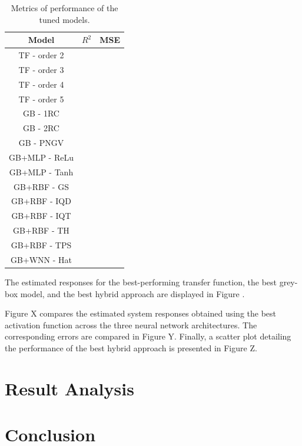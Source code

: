\documentclass[lettersize,journal]{IEEEtran}
\begin{document}
\begin{table}\label{tab:metrics}
	\centering
	\caption{Metrics of performance of the tuned models.}
	\begin{tabular}{c|c|c}
		
		Model& $R^2$ & MSE  \\
		\hline
		TF - order 2 &  &  \\
		TF - order 3 &  &  \\
		TF - order 4 &  &  \\
		TF - order 5 &  &  \\
		\hline
		GB - 1RC &  &  \\
		GB - 2RC &  &  \\
		GB - PNGV &  &  \\
		\hline
		GB+MLP - ReLu&  &  \\
		GB+MLP - Tanh&  &  \\
		GB+RBF - GS&  &  \\
		GB+RBF - IQD&  &  \\
		GB+RBF - IQT&  &  \\
		GB+RBF - TH&  &  \\
		GB+RBF - TPS&  &  \\
		GB+WNN - Hat&  &  \\
		\hline
	\end{tabular}
\end{table}


The estimated responses for the best-performing transfer function, the best grey-box model, and the best hybrid approach are displayed in Figure .

Figure X compares the estimated system responses obtained using the best activation function across the three neural network architectures. The corresponding errors are compared in Figure Y. Finally, a scatter plot detailing the performance of the best hybrid approach is presented in Figure Z.

\section{Result Analysis}


\section{Conclusion}



\end{document}
